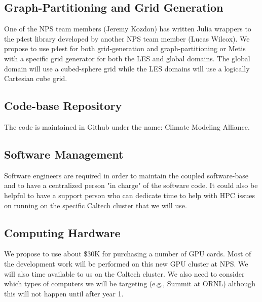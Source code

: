 \subsection{Graph-Partitioning and Grid Generation}
One of the NPS team members (Jeremy Kozdon) has written Julia wrappers to the p4est library developed by another NPS team member (Lucas Wilcox).  We propose to use p4est for both grid-generation and graph-partitioning or Metis with a specific grid generator for both the LES and global domains. The global domain will use a cubed-sphere grid while the LES domains will use a logically Cartesian cube grid.

\subsection{Code-base Repository}
The code is maintained in Github under the name: Climate Modeling Alliance.

\subsection{Software Management}
Software engineers are required in order to maintain the coupled software-base and to have a centralized person "in charge" of the software code.  It could also be helpful to have a support person who can dedicate time to help with HPC issues on running on the specific Caltech cluster that we will use.  

\subsection{Computing Hardware}
We propose to use about \$30K for purchasing a number of GPU cards.  Most of the development work will be performed on this new GPU cluster at NPS.  We will also  time available to us on the Caltech cluster. We also need to consider which types of computers we will be targeting (e.g., Summit at ORNL) although this will not happen until after year 1.
